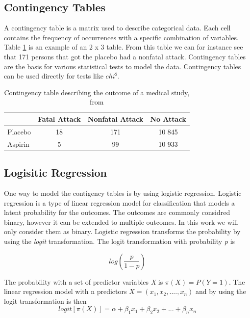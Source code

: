 \documentclass[10pt,a4paper]{report}
\begin{document}
\subsection{Contingency Tables}
A contingency table is a matrix used to describe categorical data. Each cell contains the frequency of occurrences with a specific combination of variables. Table \ref{table:contingency_table} is an example of an 2 x 3 table. From this table we can for instance see that 171 persons that got the placebo had a nonfatal attack. Contingency tables are the basis for various statistical tests to model the data. Contingency tables can be used directly for tests like $chi^2$.\cite{agresti_categorical}

\begin{table}[h]
\begin{tabular}{ l c c c }
  \hline
  & Fatal Attack & Nonfatal Attack & No Attack\\
  \hline
  Placebo & 18 & 171 & 10 845 \\
  Aspirin & 5 & 99 & 10 933 \\
  \hline  
\end{tabular}
\caption{Contingency table describing the outcome of a medical study, from \cite{agresti_categorical}}
\label{table:contingency_table}
\end{table}

\subsection{Logisitic Regression}
One way to model the contigency tables is by using logistic regression. Logistic regression is a type of linear regression model for classification that models a latent probability for the outcomes. The outcomes are commonly considred binary, however it can be extended to multiple outcomes. In this work we will only consider them as binary. Logistic regression transforms the probability by using the \emph{logit} transformation. The logit transformation with probability \emph{p} is 

\begin{equation}
log(\frac{p}{1-p})
\end{equation}


The probability with a set of predictor variables \emph{X} is $\pi(X)=P(Y=1)$. The linear regression model with n predictors $X=(x_1,x_2,....,x_n)$ and by using the logit transformation is then
\begin{equation}
logit[\pi(X)]=\alpha+\beta_1 x_1+\beta_2 x_2+...+\beta_n x_n
\end{equation}
\end{document}
